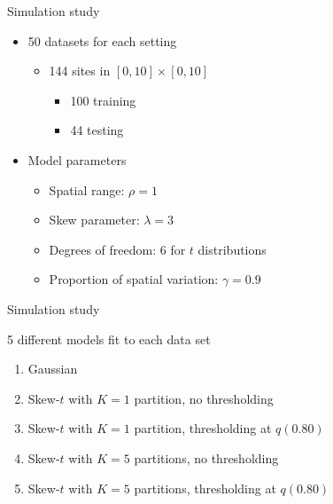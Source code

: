\documentclass{beamer}
\begin{document}
\begin{frame}{Simulation study}
  \begin{itemize} \setlength{\itemsep}{1em}
    \item 50 datasets for each setting \vspace{0.5em}
    \begin{itemize} \setlength{\itemsep}{0.5em}
      \item 144 sites in $[0, 10] \times [0, 10]$ \vspace{0.25em}
      \begin{itemize} \setlength{\itemsep}{0.25em}
        \item 100 training
        \item 44 testing
      \end{itemize}
    \end{itemize}
    \item Model parameters \vspace{0.5em}
    \begin{itemize} \setlength{\itemsep}{0.5em}
      \item Spatial range: $\rho = 1$
      \item Skew parameter: $\lambda = 3$
      \item Degrees of freedom: 6 for $t$ distributions
      \item Proportion of spatial variation: $\gamma = 0.9$
    \end{itemize}
  \end{itemize}
\end{frame}

\begin{frame}{Simulation study}
\begin{adjustwidth}{1em}{0em}
  5 different models fit to each data set \vspace{0.5em}
  \begin{enumerate}[1.] \setlength{\itemsep}{0.5em}
    \item Gaussian
    \item Skew-$t$ with $K = 1$ partition, no thresholding
    \item Skew-$t$ with $K = 1$ partition, thresholding at $q(0.80)$
    \item Skew-$t$ with $K = 5$ partitions, no thresholding
    \item Skew-$t$ with $K = 5$ partitions, thresholding at $q(0.80)$
  \end{enumerate}
\end{adjustwidth}
\end{frame}
\end{document}
